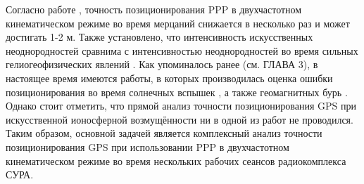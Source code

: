Согласно работе \cite{Marques2018}, точность позиционирования PPP в двухчастотном кинематическом режиме во время мерцаний снижается в несколько раз и может достигать 1-2 м.
Также установлено, что интенсивность искусственных неоднородностей сравнима с интенсивностью неоднородностей во время сильных гелиогеофизических явлений \cite{Frolov2017}.
Как упоминалось ранее (см. ГЛАВА 3), в настоящее время имеются работы, в которых производилась оценка ошибки позиционирования во время солнечных вспышек \cite{Yasyukevich2018}, а также геомагнитных бурь \cite{Jacobsen2012, Bergeot2011, Lejeune2012, Jacobsen2016, Luo2018}.
Однако стоит отметить, что прямой анализ точности позиционирования GPS при искусственной ионосферной возмущённости ни в одной из работ не проводился.   
Таким образом, основной задачей является комплексный анализ точности позиционирования GPS при использовании PPP в двухчастотном кинематическом режиме во время нескольких рабочих сеансов радиокомплекса СУРА.